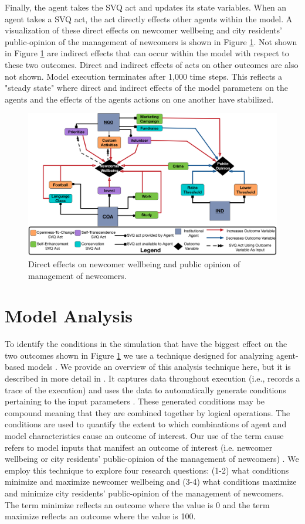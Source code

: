 \documentclass{scspaperproc}
\theoremstyle{scsthe}
\begin{document}
Finally, the agent takes the SVQ act and updates its state variables. When an agent takes a SVQ act, the act directly effects other agents within the model. A visualization of these direct effects on newcomer wellbeing and city residents' public-opinion of the management of newcomers is shown in Figure \ref{fig:model-dynamics}. Not shown in Figure \ref{fig:model-dynamics} are indirect effects that can occur within the model with respect to these two outcomes. Direct and indirect effects of acts on other outcomes are also not shown. Model execution terminates after 1,000 time steps. This reflects a "steady state" where direct and indirect effects of the model parameters on the agents and the effects of the agents actions on one another have stabilized.

\begin{figure}[htb]
{
\centering
\includegraphics[width=0.6125\columnwidth]{Newcomer-Wellbeing-Causal.png}
\caption{Direct effects on newcomer wellbeing and public opinion of management of newcomers.}
\label{fig:model-dynamics}
}
\end{figure}

\section{Model Analysis}
To identify the conditions in the simulation that have the biggest effect on the two outcomes shown in Figure \ref{fig:model-dynamics} we use a technique designed for analyzing agent-based models \cite{gore2017applying}. We provide an overview of this analysis technique here, but it is described in more detail in \cite{gore2015statistical}. It captures data throughout execution (i.e., records a trace of the execution) and uses the data to automatically generate conditions pertaining to the input parameters \cite{gore2017augmenting}. These generated conditions may be compound meaning that they are combined together by logical operations. The conditions are used to quantify the extent to which combinations of agent and model characteristics cause an outcome of interest. Our use of the term cause refers to model inputs that manifest an outcome of interest (i.e. newcomer wellbeing or city residents' public-opinion of the management of newcomers) \cite{cox1992causality}. We employ this technique to explore four research questions: (1-2) what conditions minimize and maximize newcomer wellbeing and (3-4) what conditions maximize and minimize city residents' public-opinion of the management of newcomers.  The term minimize reflects an outcome where the value is 0 and the term maximize reflects an outcome where the value is 100. 
\end{document}
